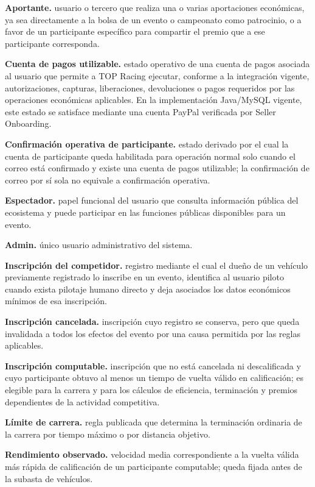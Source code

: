\documentclass[10pt,letterpaper]{article}
\begin{document}
\noindent\textbf{Aportante.} usuario o tercero que realiza una o varias aportaciones económicas, ya sea directamente a la bolsa de un evento o campeonato como patrocinio, o a favor de un participante específico para compartir el premio que a ese participante corresponda.\par
\noindent\textbf{Cuenta de pagos utilizable.} estado operativo de una cuenta de pagos asociada al usuario que permite a TOP Racing ejecutar, conforme a la integración vigente, autorizaciones, capturas, liberaciones, devoluciones o pagos requeridos por las operaciones económicas aplicables. En la implementación Java/MySQL vigente, este estado se satisface mediante una cuenta PayPal verificada por Seller Onboarding.\par
\noindent\textbf{Confirmación operativa de participante.} estado derivado por el cual la cuenta de participante queda habilitada para operación normal solo cuando el correo está confirmado y existe una cuenta de pagos utilizable; la confirmación de correo por sí sola no equivale a confirmación operativa.\par
\noindent\textbf{Espectador.} papel funcional del usuario que consulta información pública del ecosistema y puede participar en las funciones públicas disponibles para un evento.\par
\noindent\textbf{Admin.} único usuario administrativo del sistema.\par
\noindent\textbf{Inscripción del competidor.} registro mediante el cual el dueño de un vehículo previamente registrado lo inscribe en un evento, identifica al usuario piloto cuando exista pilotaje humano directo y deja asociados los datos económicos mínimos de esa inscripción.\par
\noindent\textbf{Inscripción cancelada.} inscripción cuyo registro se conserva, pero que queda invalidada a todos los efectos del evento por una causa permitida por las reglas aplicables.\par
\noindent\textbf{Inscripción computable.} inscripción que no está cancelada ni descalificada y cuyo participante obtuvo al menos un tiempo de vuelta válido en calificación; es elegible para la carrera y para los cálculos de eficiencia, terminación y premios dependientes de la actividad competitiva.\par
\noindent\textbf{Límite de carrera.} regla publicada que determina la terminación ordinaria de la carrera por tiempo máximo o por distancia objetivo.\par
\noindent\textbf{Rendimiento observado.} velocidad media correspondiente a la vuelta válida más rápida de calificación de un participante computable; queda fijada antes de la subasta de vehículos.\par
\end{document}
